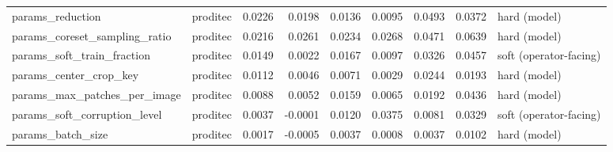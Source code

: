 \begin{tabular}{llrrrrrrl}
             params\_reduction & proditec &              0.0226 &            0.0198 &                        0.0136 &                      0.0095 &           0.0493 &                     0.0372 &           hard (model) \\
params\_coreset\_sampling\_ratio & proditec &              0.0216 &            0.0261 &                        0.0234 &                      0.0268 &           0.0471 &                     0.0639 &           hard (model) \\
   params\_soft\_train\_fraction & proditec &              0.0149 &            0.0022 &                        0.0167 &                      0.0097 &           0.0326 &                     0.0457 & soft (operator-facing) \\
       params\_center\_crop\_key & proditec &              0.0112 &            0.0046 &                        0.0071 &                      0.0029 &           0.0244 &                     0.0193 &           hard (model) \\
 params\_max\_patches\_per\_image & proditec &              0.0088 &            0.0052 &                        0.0159 &                      0.0065 &           0.0192 &                     0.0436 &           hard (model) \\
 params\_soft\_corruption\_level & proditec &              0.0037 &           -0.0001 &                        0.0120 &                      0.0375 &           0.0081 &                     0.0329 & soft (operator-facing) \\
            params\_batch\_size & proditec &              0.0017 &           -0.0005 &                        0.0037 &                      0.0008 &           0.0037 &                     0.0102 &           hard (model) \\
\bottomrule
\end{tabular}
